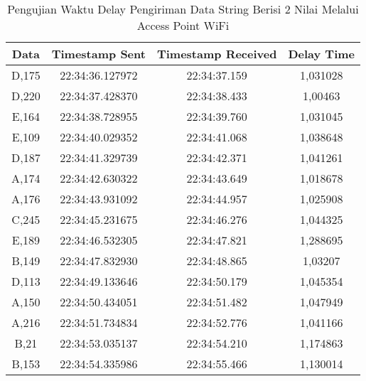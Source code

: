 \begin{table}[!h]
\centering
  \caption{Pengujian Waktu Delay Pengiriman Data String Berisi 2 Nilai Melalui Access Point WiFi}
  \label{tbl:delayWiFi2}
  \begin{tabular}{|ccc|c|}
  \hline
  \multicolumn{1}{|c|}{Data}  & \multicolumn{1}{c|}{Timestamp Sent}  & Timestamp Received & Delay Time  \\ \hline
  \multicolumn{1}{|c|}{D,175} & \multicolumn{1}{c|}{22:34:36.127972} & 22:34:37.159       & 1,031028    \\ \hline
  \multicolumn{1}{|c|}{D,220} & \multicolumn{1}{c|}{22:34:37.428370} & 22:34:38.433       & 1,00463     \\ \hline
  \multicolumn{1}{|c|}{E,164} & \multicolumn{1}{c|}{22:34:38.728955} & 22:34:39.760       & 1,031045    \\ \hline
  \multicolumn{1}{|c|}{E,109} & \multicolumn{1}{c|}{22:34:40.029352} & 22:34:41.068       & 1,038648    \\ \hline
  \multicolumn{1}{|c|}{D,187} & \multicolumn{1}{c|}{22:34:41.329739} & 22:34:42.371       & 1,041261    \\ \hline
  \multicolumn{1}{|c|}{A,174} & \multicolumn{1}{c|}{22:34:42.630322} & 22:34:43.649       & 1,018678    \\ \hline
  \multicolumn{1}{|c|}{A,176} & \multicolumn{1}{c|}{22:34:43.931092} & 22:34:44.957       & 1,025908    \\ \hline
  \multicolumn{1}{|c|}{C,245} & \multicolumn{1}{c|}{22:34:45.231675} & 22:34:46.276       & 1,044325    \\ \hline
  \multicolumn{1}{|c|}{E,189} & \multicolumn{1}{c|}{22:34:46.532305} & 22:34:47.821       & 1,288695    \\ \hline
  \multicolumn{1}{|c|}{B,149} & \multicolumn{1}{c|}{22:34:47.832930} & 22:34:48.865       & 1,03207     \\ \hline
  \multicolumn{1}{|c|}{D,113} & \multicolumn{1}{c|}{22:34:49.133646} & 22:34:50.179       & 1,045354    \\ \hline
  \multicolumn{1}{|c|}{A,150} & \multicolumn{1}{c|}{22:34:50.434051} & 22:34:51.482       & 1,047949    \\ \hline
  \multicolumn{1}{|c|}{A,216} & \multicolumn{1}{c|}{22:34:51.734834} & 22:34:52.776       & 1,041166    \\ \hline
  \multicolumn{1}{|c|}{B,21}  & \multicolumn{1}{c|}{22:34:53.035137} & 22:34:54.210       & 1,174863    \\ \hline
  \multicolumn{1}{|c|}{B,153} & \multicolumn{1}{c|}{22:34:54.335986} & 22:34:55.466       & 1,130014    \\ \hline

\end{tabular}
\end{table}
